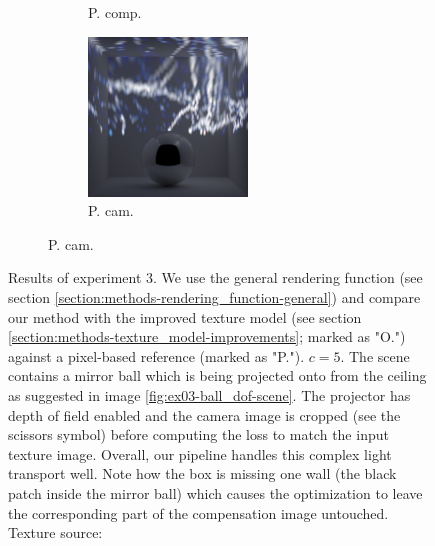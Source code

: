 \begin{figure}[]
\begin{subfigure}{\textwidth}
\begin{subfigure}{0.19\textwidth}
            \caption{P. comp.}
            \label{fig:ex03-ball_dof-marble-pixel_im}
        \end{subfigure}
        \hfill
        \begin{subfigure}{0.19\textwidth}
            \centering
            \includegraphics[width=\textwidth]{images/04-experiment03/ball_dof/marble/pixel_proj.jpg}
            \caption{P. cam.}
            \label{fig:ex03-ball_dof-marble-pixel_proj}
        \end{subfigure}
    \end{subfigure}
    \caption{Results of experiment 3. We use the general rendering function (see section  \ref{section:methods-rendering_function-general}) and compare our method with the improved texture model (see section \ref{section:methods-texture_model-improvements}; marked as "O.") against a pixel-based reference (marked as "P."). \(c = 5\). The scene contains a mirror ball which is being projected onto from the ceiling as suggested in image \ref{fig:ex03-ball_dof-scene}. The projector has depth of field enabled and the camera image is cropped (see the scissors symbol) before computing the loss to match the input texture image. Overall, our pipeline handles this complex light transport well. Note how the box is missing one wall (the black patch inside the mirror ball) which causes the optimization to leave the corresponding part of the compensation image untouched. Texture source: \citet{Pixar128}}
    \label{fig:ex03-ball_dof}
\end{figure}


